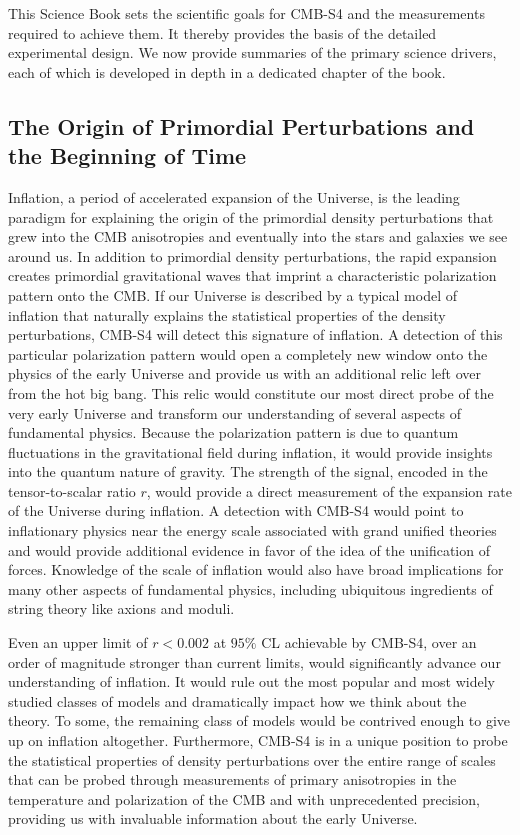 This Science Book sets the scientific goals for CMB-S4 and the measurements required to achieve them. It thereby provides the basis of the detailed experimental design. We now provide summaries of the primary science drivers, each of which is developed in depth in a dedicated chapter of the book.

\subsection*{The Origin of Primordial Perturbations and the Beginning of Time}

Inflation, a period of accelerated expansion of the Universe, is the leading paradigm for explaining the origin of the primordial density perturbations that grew into the CMB anisotropies and eventually into the stars and galaxies we see around us. In addition to primordial density perturbations, the rapid expansion creates primordial gravitational waves that imprint a characteristic polarization pattern onto the CMB. If our Universe is described by a typical model of inflation that naturally explains the statistical properties of the density perturbations, CMB-S4 will detect this signature of inflation. A detection of this particular polarization pattern would open a completely new window onto the physics of the early Universe and provide us with an additional relic left over from the hot big bang. This relic would constitute our most direct probe of the very early Universe and transform our understanding of several aspects of fundamental physics. Because the polarization pattern is due to quantum fluctuations in the gravitational field during inflation, it would provide insights into the quantum nature of gravity. The strength of the signal, encoded in the tensor-to-scalar ratio $r$, would provide a direct measurement of the expansion rate of the Universe during inflation. A detection with CMB-S4 would point to inflationary physics near the energy scale associated with grand unified theories and would provide additional evidence in favor of the idea of the unification of forces. Knowledge of the scale of inflation would also have broad implications for many other aspects of fundamental physics, including ubiquitous ingredients of string theory like axions and moduli.

Even an upper limit of $r<0.002$ at $95\%$ CL achievable by CMB-S4, over an order of magnitude stronger than current limits, would significantly advance our understanding of inflation. It would rule out the most popular and most widely studied classes of models and dramatically impact how we think about the theory. To some, the remaining class of models would be contrived enough to give up on inflation altogether. Furthermore, CMB-S4 is in a unique position to probe the statistical properties of density perturbations over the entire range of scales that can be probed through measurements of primary anisotropies in the temperature and polarization of the CMB and with unprecedented precision, providing us with invaluable information about the early Universe.


